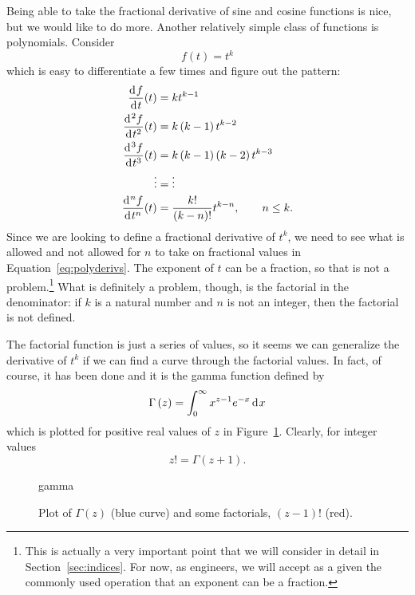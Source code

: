 Being able to take the fractional derivative of sine and cosine functions is nice, but we would like to do more. Another relatively simple class of functions is polynomials. Consider 
\begin{equation}
  f(t) = t^k
  \label{eq:poly}
\end{equation}
which is easy to differentiate a few times and figure out the pattern:
\begin{align}
  \frac{\operatorname{d}\hspace*{-1pt} f}{\operatorname{d}\hspace*{-1pt} t}(t) &= k t^{k-1} \\
  \frac{\operatorname{d}\hspace*{-1pt}^2 f}{\operatorname{d}\hspace*{-1pt} t^2}(t) &= k \left( k-1 \right) t^{k-2} \\
  \frac{\operatorname{d}\hspace*{-1pt}^3 f}{\operatorname{d}\hspace*{-1pt} t^3}(t) &= k \left( k-1 \right) \left( k - 2 \right) t^{k-3} \\
  \vdots &= \vdots \\
  \frac{\operatorname{d}\hspace*{-1pt}^n f}{\operatorname{d}\hspace*{-1pt} t^n}(t) &= \frac{k!}{\left( k - n \right)!} t^{k-n}, \qquad n \leq k.
  \label{eq:polyderivs}
\end{align}
Since we are looking to define a fractional derivative of $t^k$, we need to see what is allowed and not allowed for $n$ to take on fractional values in Equation~\ref{eq:polyderivs}. The exponent of $t$ can be a fraction, so that is not a problem.\footnote{This is actually a very important point that we will consider in detail in Section~\ref{sec:indices}. For now, as engineers, we will accept as a given the commonly used operation that an exponent can be a fraction.} What is definitely a problem, though, is the factorial in the denominator: if $k$ is a natural number and $n$ is not an integer, then the factorial is not defined.

The factorial function is just a series of values, so it seems we can generalize the derivative of $t^k$ if we can find a curve through the factorial values. In fact, of course, it has been done and it is the gamma function defined by
\begin{equation}
  \Gamma\left(z\right) = \int_0^\infty x^{z - 1} e^{-x} \operatorname{d}\hspace*{-1pt} x
  \label{eq:gamma}
\end{equation}
which is plotted for positive real values of $z$ in Figure~\ref{fig:gamma}. Clearly, for integer values
\begin{equation}
  z! = \Gamma\left( z + 1 \right).
\end{equation}

\begin{figure}
  \centering
  {gamma}
  \caption{Plot of $\Gamma(z)$ (blue curve) and some factorials, $\left(z - 1\right)!$ (red).}
  \label{fig:gamma}
\end{figure}

